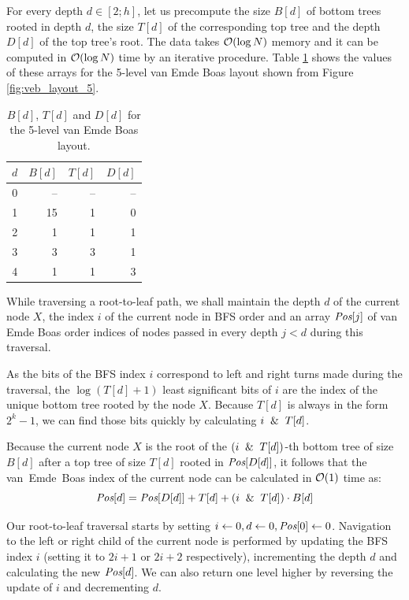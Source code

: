 For every depth $d\in[2;h]$, let us precompute the size $B[d]$ of
bottom trees rooted in depth $d$, the size $T[d]$ of the corresponding
top tree and the depth $D[d]$ of the top tree's root. The data takes $\mathcal{O}(\log
N)$ memory and it can be computed in $\mathcal{O}(\log N)$ time by an iterative procedure.
Table \ref{tab:depth_data_example} shows the values of these arrays
for the 5-level van Emde Boas layout shown from Figure \ref{fig:veb_layout_5}.

\begin{table}[h]
	\centering
	\begin{tabular}{r|r|r|r}
		$d$ & $B[d]$ & $T[d]$ & $D[d]$ \\
		\hline
		0   & --     & --     & --     \\
		1   & 15     & 1      & 0      \\
		2   & 1      & 1      & 1      \\
		3   & 3      & 3      & 1      \\
		4   & 1      & 1      & 3
	\end{tabular}
	\caption{$B[d]$, $T[d]$ and $D[d]$ for the 5-level van Emde
	Boas layout.}
	\label{tab:depth_data_example}
\end{table}

\def\Pos{\hbox{\it Pos}}

While traversing a root-to-leaf path, we shall maintain the depth
$d$ of the current node $X$, the index $i$ of the current node in BFS order
and an array $\Pos[j]$ of van Emde Boas order indices of nodes passed in every
depth $j<d$ during this traversal.

As the bits of the BFS index $i$ correspond to left and right turns made during
the traversal, the $\log(T[d]+1)$ least significant bits of $i$ are the
index of the unique bottom tree rooted by the node $X$. Because $T[d]$ is
always in the form $2^k-1$, we can find those bits quickly by calculating
$i \And T[d]$.

Because the current node $X$ is the root of the $(i \And T[d])$-th
bottom tree of size $B[d]$ after a top tree of size $T[d]$ rooted in
$\Pos[D[d]]$, it follows that the van~Emde~Boas index of the current node can be
calculated in $\mathcal{O}(1)$ time as:
$$\Pos[d]=\Pos[D[d]] + T[d] + (i \And T[d]) \cdot B[d]$$

Our root-to-leaf traversal starts by setting $i\gets 0, d\gets 0,
\Pos[0]\gets 0$.
Navigation to the left or right child of the current node is performed
by updating the BFS index $i$ (setting it to $2i+1$ or $2i+2$ respectively),
incrementing the depth $d$ and calculating the new $\Pos[d]$.
We can also return one level higher by reversing the update of $i$ and
decrementing $d$.

